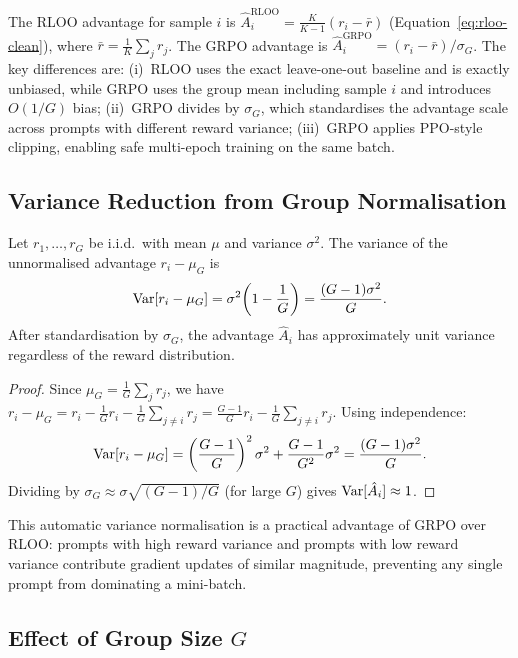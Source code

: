 The RLOO advantage for sample $i$ is $\hat{A}_i^{\mathrm{RLOO}} = \frac{K}{K-1}(r_i - \bar{r})$ (Equation~\eqref{eq:rloo-clean}), where $\bar{r} = \frac{1}{K}\sum_j r_j$.  The GRPO advantage is $\hat{A}_i^{\mathrm{GRPO}} = (r_i - \bar{r}) / \sigma_G$.  The key differences are: (i)~RLOO uses the exact leave-one-out baseline and is exactly unbiased, while GRPO uses the group mean including sample $i$ and introduces $O(1/G)$ bias; (ii)~GRPO divides by $\sigma_G$, which standardises the advantage scale across prompts with different reward variance; (iii)~GRPO applies PPO-style clipping, enabling safe multi-epoch training on the same batch.

\subsection{Variance Reduction from Group Normalisation}

\begin{proposition}
\label{prop:grpo-variance}
Let $r_1, \ldots, r_G$ be i.i.d.\ with mean $\mu$ and variance $\sigma^2$.  The variance of the unnormalised advantage $r_i - \mu_G$ is
\begin{equation}
\label{eq:grpo-var-unnorm}
\operatorname{Var}[r_i - \mu_G] = \sigma^2\!\left(1 - \frac{1}{G}\right) = \frac{(G-1)\sigma^2}{G}.
\end{equation}
After standardisation by $\sigma_G$, the advantage $\hat{A}_i$ has approximately unit variance regardless of the reward distribution.
\end{proposition}

\begin{proof}
Since $\mu_G = \frac{1}{G}\sum_j r_j$, we have $r_i - \mu_G = r_i - \frac{1}{G}r_i - \frac{1}{G}\sum_{j \neq i} r_j = \frac{G-1}{G}r_i - \frac{1}{G}\sum_{j \neq i} r_j$.  Using independence:
\[
\operatorname{Var}[r_i - \mu_G] = \left(\frac{G-1}{G}\right)^2 \sigma^2 + \frac{G-1}{G^2}\sigma^2 = \frac{(G-1)\sigma^2}{G}.
\]
Dividing by $\sigma_G \approx \sigma\sqrt{(G-1)/G}$ (for large $G$) gives $\operatorname{Var}[\hat{A}_i] \approx 1$.
\end{proof}

This automatic variance normalisation is a practical advantage of GRPO over RLOO: prompts with high reward variance and prompts with low reward variance contribute gradient updates of similar magnitude, preventing any single prompt from dominating a mini-batch.

\subsection{Effect of Group Size $G$}

